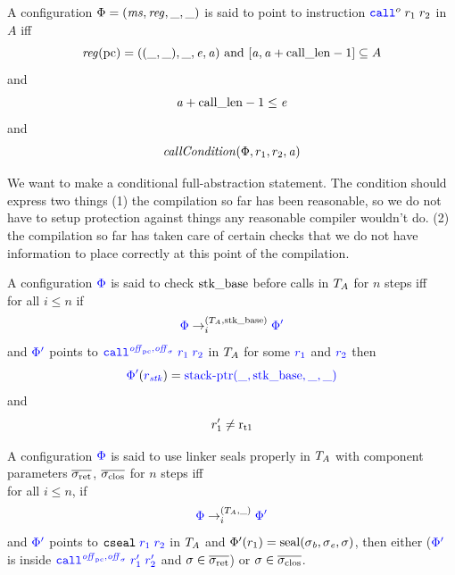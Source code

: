 \documentclass[a4paper]{article}
\begin{document}
\begin{definition}
  \label{def:points-to-call}
  A configuration {\sourcecolor $\Phi = (\ms,\reg,\_,\_)$} is said to point to instruction $\scall{o}{r_1}{r_2}$ in $A$ iff
  \[
    \reg(\pcreg) = ((\_,\_),\_,\eaddr,\aaddr) \tand [\aaddr,\aaddr+\calllen-1] \subseteq A
  \]
and
\[
  \aaddr+\calllen - 1 \leq \eaddr
\]
and
\[
  \callCond{\Phi,r_1,r_2,\aaddr}
\]
\end{definition}
We want to make a conditional full-abstraction statement. The condition should express two things (1) the compilation so far has been reasonable, so we do not have to setup protection against things any reasonable compiler wouldn't do. (2) the compilation so far has taken care of certain checks that we do not have information to place correctly at this point of the compilation.
\begin{definition}
  \label{def:check-stack-addr-before-call}
  A configuration $\src{\Phi}$ is said to check $\stkb$ before calls in $\ta$ for $n$ steps iff\\
  for all $i \leq n$ if
  \[
    \src{\Phi} \nstep[i]{(\ta,\stkb)} \src{\Phi'}
  \]
  and $\src{\Phi'}$ points to $\src{\scall{\offpc,\offsigma}{r_1}{r_2}}$ in $\ta$ for some $\src{r_1}$ and $\src{r_2}$
  then
  \[
    \src{\Phi'}(\src{r_\stk}) = \src{\stkptr{\_,\stkb,\_,\_}}
  \]
  and
  \[
    r_1' \neq \rtmp{1}
  \]
\end{definition}

\begin{definition}
  \label{def:use-return-seals-call}
  A configuration $\src{\Phi}$ is said to use linker seals properly in $\ta$ with component parameters $\sigrets$, $\sigcloss$ for $n$ steps iff\\
  for all $i \leq n$, if
  \[
    \src{\Phi} \nstep[i]{(\ta,\_)} \src{\Phi'}
  \]
  and $\src{\Phi'}$ points to $\src{\tcseal{r_1}{r_2}}$ in $\ta$ and $\Phi'(r_1) = \seal{\sigma_\baddr,\sigma_\eaddr,\sigma}$, then either ($\src{\Phi'}$ is inside $\src{\scall{\offpc,\offsigma}{r_1'}{r_2'}}$ and $\sigma \in \sigrets$) or $\sigma \in \sigcloss$.
\end{definition}
\end{document}

